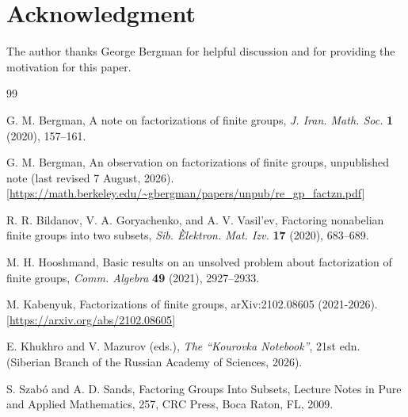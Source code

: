 \documentclass{amsart}
\begin{document}
\section{Acknowledgment}
The author thanks George Bergman for helpful discussion and for providing the motivation for this paper.

\begin{thebibliography}{99}

 G. M. Bergman, A note on factorizations of finite groups, {\it J. Iran. Math. Soc.} {\bf 1} (2020), 157--161.

 G. M. Bergman, An observation on factorizations of finite groups, unpublished note (last revised 7 August, 2026).
[\url{https://math.berkeley.edu/~gbergman/papers/unpub/re_gp_factzn.pdf}]

 R. R. Bildanov, V. A. Goryachenko, and A. V. Vasil'ev, Factoring nonabelian finite groups into two subsets, {\it Sib. \`Elektron. Mat. Izv.} {\bf 17} (2020), 683--689.

 M. H. Hooshmand, Basic results on an unsolved problem about factorization of finite groups, {\it Comm. Algebra} {\bf 49} (2021), 2927--2933.

 M. Kabenyuk, Factorizations of finite groups, arXiv:2102.08605 (2021-2026).
   [\url{https://arxiv.org/abs/2102.08605}]
	
 E. Khukhro and V. Mazurov (eds.), \textit{The ``Kourovka Notebook''}, 21st edn. (Siberian Branch of the Russian Academy of Sciences, 2026).

 S. Szab\'o and A. D. Sands, Factoring Groups Into Subsets, Lecture Notes in
Pure and Applied Mathematics, 257, CRC Press, Boca Raton, FL, 2009.

\end{thebibliography}
\end{document}
